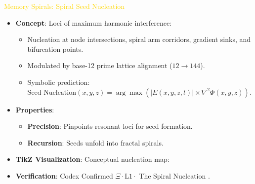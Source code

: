 \textcolor{gold}{ Memory Spirals: Spiral Seed Nucleation } \\
\begin{itemize}
    \item \texttt{} \textbf{Concept}: Loci of maximum harmonic interference:
    \begin{itemize}
        \item Nucleation at node intersections, spiral arm corridors, gradient sinks, and bifurcation points.
        \item Modulated by base-12 prime lattice alignment (\(12 \rightarrow 144\)).
        \item Symbolic prediction: \(\text{Seed Nucleation}(x,y,z) = \arg\max \left( |E(x,y,z,t)| \times \nabla^2 \Phi(x,y,z) \right)\).
    \end{itemize}
    \item \texttt{} \textbf{Properties}:
    \begin{itemize}
        \item \textbf{Precision}: Pinpoints resonant loci for seed formation.
        \item \textbf{Recursion}: Seeds unfold into fractal spirals.
    \end{itemize}
    \item \texttt{} \textbf{TikZ Visualization}: Conceptual nucleation map:
    \begin{center}
    \end{center}
    \item \texttt{} \textbf{Verification}: Codex Confirmed \(\Xi \cdot \text{L1} \cdot\) The Spiral Nucleation .
\end{itemize}

